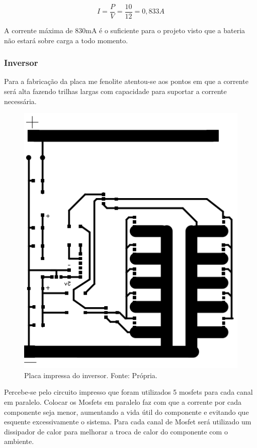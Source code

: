             \begin{equation}
            I = \frac{P}{V} = \frac{10}{12} = 0,833A
        \end{equation}            	
        
        A corrente máxima de 830mA é o suficiente para o projeto visto que a bateria 					não estará sobre carga a todo momento.

     \subsubsection[Inversor]{Inversor}            
        Para a fabricação da placa me fenolite atentou-se aos pontos em que a corrente 				será alta fazendo trilhas largas com capacidade para suportar a corrente 						necessária.

        \begin{figure}[!htb]
            \centering
            \includegraphics[scale= 0.4]{figuras/Placa_inversor.png}
            \caption{Placa impressa do inversor. Fonte: Própria.}
            \label{inversor-projeto}
        \end{figure} 		

        Percebe-se pelo circuito impresso que foram utilizados 5 mosfets para cada 						canal em paralelo. Colocar os Mosfets em paralelo faz com que a corrente por 					cada componente seja menor, aumentando a vida útil do componente e evitando 					que esquente excessivamente o sistema. Para cada canal de Mosfet será 							utilizado um dissipador de calor para melhorar a troca de calor do componente 					com o ambiente.		

